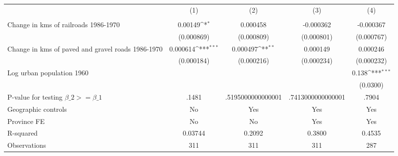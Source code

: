 {
\def\sym#1{\ifmmode^{#1}\else\(^{#1}\)\fi}
\begin{tabular}{l*{4}{c}}
\hline\hline
                &\multicolumn{1}{c}{(1)}&\multicolumn{1}{c}{(2)}&\multicolumn{1}{c}{(3)}&\multicolumn{1}{c}{(4)}\\
                &\multicolumn{1}{c}{}&\multicolumn{1}{c}{}&\multicolumn{1}{c}{}&\multicolumn{1}{c}{}\\
\hline
Change in kms of railroads 1986-1970&  0.00149\sym{*}  & 0.000458         &-0.000362         &-0.000367         \\
                &(0.000869)         &(0.000809)         &(0.000801)         &(0.000767)         \\
[1em]
Change in kms of paved and gravel roads 1986-1970& 0.000614\sym{***}& 0.000497\sym{**} & 0.000149         & 0.000246         \\
                &(0.000184)         &(0.000216)         &(0.000234)         &(0.000232)         \\
[1em]
Log urban population 1960&                  &                  &                  &    0.138\sym{***}\\
                &                  &                  &                  & (0.0300)         \\
\hline
P-value for testing $\beta\_{2} >= \beta\_{1}$&    .1481         &.5195000000000001         &.7413000000000001         &    .7904         \\
Geographic controls&       No         &      Yes         &      Yes         &      Yes         \\
Province FE     &       No         &       No         &      Yes         &      Yes         \\
R-squared       &  0.03744         &   0.2092         &   0.3800         &   0.4535         \\
Observations    &      311         &      311         &      311         &      287         \\
\hline\hline
\end{tabular}
}
